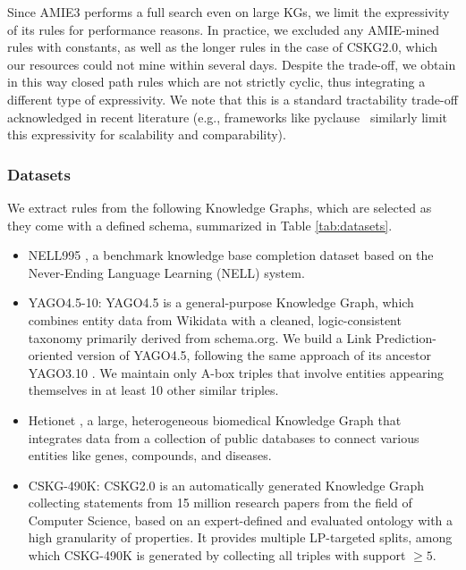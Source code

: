 \documentclass[a4paper,UKenglish,cleveref, autoref, thm-restate]{tgdk-v2021}
\begin{document}
\noindent Since AMIE3 performs a full search even on large KGs, we limit the expressivity of its rules for performance reasons. In practice, we excluded any AMIE-mined rules with constants, as well as the longer rules in the case of CSKG2.0, which our resources could not mine within several days. Despite the trade-off, we obtain in this way closed path rules which are not strictly cyclic, thus integrating a different type of expressivity. We note that this is a standard tractability trade-off acknowledged in recent literature (e.g., frameworks like pyclause~\cite{betz_pyclause_2024} similarly limit this expressivity for scalability and comparability).

\subsubsection{Datasets} We extract rules from the following Knowledge Graphs, which are selected as they come with a defined schema, summarized in Table \ref{tab:datasets}. 

\begin{itemize}
    \item NELL995 \cite{xiong_deeppath_2017}, a benchmark knowledge base completion dataset based on the Never-Ending Language Learning (NELL) system.
    \item YAGO4.5-10: YAGO4.5 \cite{suchanek_yago_2024} is a general-purpose Knowledge Graph, which combines entity data from Wikidata with a cleaned, logic-consistent taxonomy primarily derived from schema.org. We build a Link Prediction-oriented version of YAGO4.5, following the same approach of its ancestor YAGO3.10 \cite{dettmers_convolutional_2018}. We maintain only A-box triples that involve entities appearing themselves in at least 10 other similar triples. 
    \item Hetionet \cite{himmelstein_systematic_2017}, a large, heterogeneous biomedical Knowledge Graph that integrates data from a collection of public databases to connect various entities like genes, compounds, and diseases.
    \item CSKG-490K: CSKG2.0 \cite{dessi_cs-kg_2025} is an automatically generated Knowledge Graph collecting statements from 15 million research papers from the field of Computer Science, based on an expert-defined and evaluated ontology with a high granularity of properties. It provides multiple LP-targeted splits, among which CSKG-490K is generated by collecting all triples with support $\geq5$.
\end{itemize}
\end{document}

